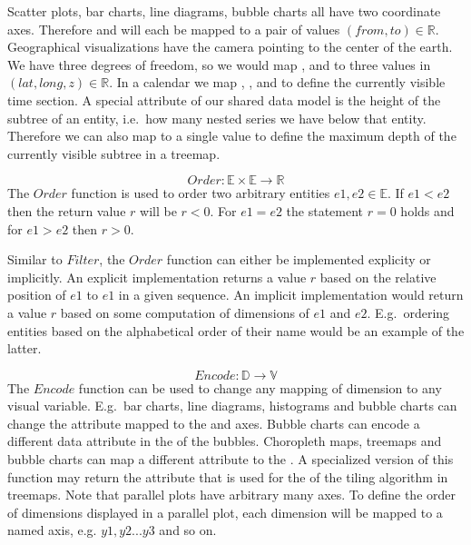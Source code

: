   Scatter plots, bar charts, line diagrams, bubble charts all have two coordinate axes.
  Therefore  and  will each be mapped to a pair of values $(from,to) \in \mathbb{R}$.
  Geographical visualizations have the camera pointing to the center of the earth.
  We have three degrees of freedom, so we would map ,  and  to three values in $(lat,long,z) \in \mathbb{R}$.
  In a calendar we map , ,  and  to define the currently visible time section.
  A special attribute of our shared data model is the height of the subtree of an entity, i.e.\ how many nested series we have below that entity.
  Therefore we can also map  to a single value to define the maximum depth of the currently visible subtree in a treemap.

\begin{equation} Order: \mathbb{E} \times \mathbb{E} \rightarrow \mathbb{R} \end{equation}
  The $Order$ function is used to order two arbitrary entities $e1, e2 \in \mathbb{E}$.
  If $e1 < e2$ then the return value $r$ will be $ r < 0 $.
  For $e1 = e2$ the statement $r = 0$ holds and for $e1 > e2$ then $r > 0$.

  Similar to $Filter$, the $Order$ function can either be implemented explicity or implicitly.
  An explicit implementation returns a value $r$ based on the relative position of $e1$ to $e1$ in a given sequence.
  An implicit implementation would return a value $r$ based on some computation of dimensions of $e1$ and $e2$.
  E.g.\ ordering entities based on the alphabetical order of their name would be an example of the latter.

\begin{equation} Encode: \mathbb{D} \rightarrow \mathbb{V} \end{equation}
  The $Encode$ function can be used to change any mapping of dimension to any visual variable.
  E.g.\ bar charts, line diagrams, histograms and bubble charts can change the attribute mapped to the  and  axes.
  Bubble charts can encode a different data attribute in the  of the bubbles.
  Choropleth maps, treemaps and bubble charts can map a different attribute to the .
  A specialized version of this function may return the attribute that is used for the  of the tiling algorithm in treemaps.
  Note that parallel plots have arbitrary many  axes.
  To define the order of dimensions displayed in a parallel plot, each dimension will be mapped to a named  axis, e.g. $y1, y2 ... y3$ and so on.


